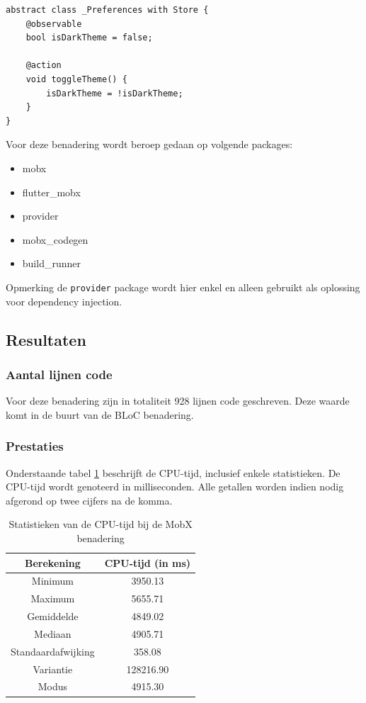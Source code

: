 \begin{verbatim}
abstract class _Preferences with Store {
    @observable
    bool isDarkTheme = false;

    @action
    void toggleTheme() {
        isDarkTheme = !isDarkTheme;
    }
}
\end{verbatim}

Voor deze benadering wordt beroep gedaan op volgende packages: 
\begin{itemize}
    \item{mobx}
    \item{flutter\_mobx}
    \item{provider}
    \item{mobx\_codegen}
    \item{build\_runner}
\end{itemize}
Opmerking de \verb|provider| package wordt hier enkel en alleen gebruikt als oplossing voor dependency injection.

\subsection{Resultaten}
\subsubsection{Aantal lijnen code}
Voor deze benadering zijn in totaliteit 928 lijnen code geschreven. Deze waarde komt in de buurt van de BLoC benadering.
\subsubsection{Prestaties}
Onderstaande tabel \ref{table:experiment-mobx-statistics} beschrijft de CPU-tijd, inclusief enkele statistieken. De CPU-tijd wordt genoteerd in milliseconden. Alle getallen worden indien nodig afgerond op twee cijfers na de komma.
\begin{table}[H]
    \centering
    \begin{tabular}{c|c}
        \textbf{Berekening} & \textbf{CPU-tijd (in ms)}  \\ \hline
        Minimum             & 3950.13                    \\ \hline
        Maximum             & 5655.71                    \\ \hline
        Gemiddelde          & 4849.02                    \\ \hline
        Mediaan             & 4905.71                    \\ \hline
        Standaardafwijking  & 358.08                     \\ \hline
        Variantie           & 128216.90                  \\ \hline
        Modus               & 4915.30                    \\                
    \end{tabular}
    \caption{Statistieken van de CPU-tijd bij de MobX benadering}
    \label{table:experiment-mobx-statistics}
\end{table}

